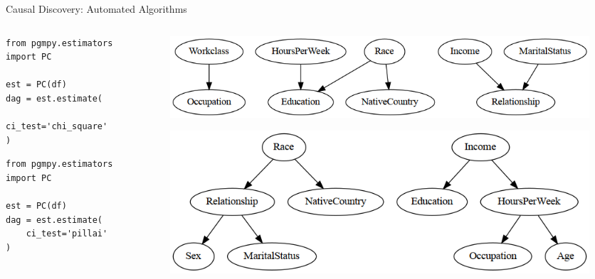 \documentclass[aspectratio=169]{beamer}
\begin{document}
\begin{frame}[fragile]{Causal Discovery: Automated Algorithms}
	\begin{columns}
		\begin{column}{0.45 \textwidth}
			\begin{verbatim}
from pgmpy.estimators import PC

est = PC(df)
dag = est.estimate(
	ci_test='chi_square'
)
			\end{verbatim}
			\vspace{4em}

			\begin{verbatim}
from pgmpy.estimators import PC

est = PC(df)
dag = est.estimate(
	ci_test='pillai'
)
			\end{verbatim}
		\end{column}
		\begin{column}{0.55 \textwidth}
			\begin{figure}
				\includegraphics[scale=0.3]{imgs/adult_x2.png}
			\end{figure}
			\vspace{2em}
			\begin{figure}
				\includegraphics[scale=0.3]{imgs/adult_pillai.png}
			\end{figure}
		\end{column}
	\end{columns}


\end{frame}
\end{document}
